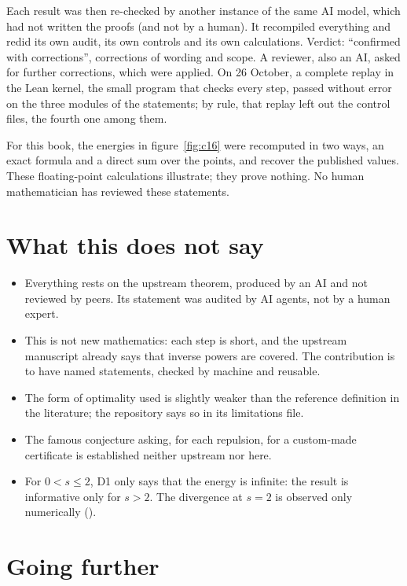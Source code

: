 Each result was then re-checked by another instance of the same AI model, which had not written the proofs (and
not by a human). It recompiled everything and redid its own audit, its own controls and its own calculations.
Verdict: ``confirmed with corrections'', corrections of wording and scope. A reviewer, also an AI, asked for further
corrections, which were applied. On 26 October, a complete replay in the Lean kernel, the small program that
checks every step, passed without error on the three modules of the statements; by rule, that replay left out the
control files, the fourth one among them.

For this book, the energies in figure~\ref{fig:c16} were recomputed in two ways, an exact formula and a direct sum
over the points, and recover the published values. These floating-point calculations illustrate; they prove
nothing.
No human mathematician has reviewed these statements.

\section*{What this does not say}

\begin{limite}
\begin{itemize}
\item Everything rests on the upstream theorem, produced by an AI and not reviewed by peers. Its statement was
  audited by AI agents, not by a human expert.
\item This is not new mathematics: each step is short, and the upstream manuscript already says that inverse powers
  are covered. The contribution is to have named statements, checked by machine and reusable.
\item The form of optimality used is slightly weaker than the reference definition in the literature; the
  repository says so in its limitations file.
\item The famous conjecture asking, for each repulsion, for a custom-made certificate is established neither
  upstream nor here.
\item For $0<s\le2$, D1 only says that the energy is infinite: the result is informative only for $s>2$.
  The divergence at $s=2$ is observed only numerically ().
\end{itemize}
\end{limite}

\section*{Going further}

